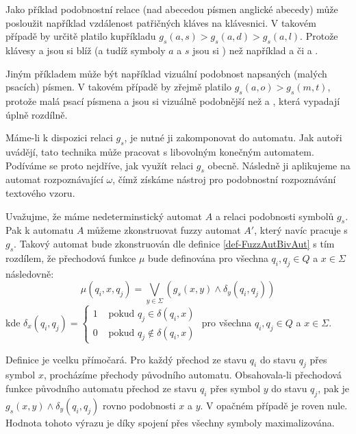 \documentclass[a4paper,10pt]{article}
\begin{document}
\begin{example}
 Jako příklad podobnostní relace (nad abecedou písmen anglické abecedy) může posloužit například vzdálenost patřičných kláves na klávesnici. V takovém případě by určitě platilo kupříkladu $g_s(a,s) > g_s(a, d) > g_s(a, l)$. Protože klávesy  a  jsou si blíž (a tudíž symboly $a$ a $s$ jsou si ) než například  a  či  a .
 
 Jiným příkladem může být například vizuální podobnost napsaných (malých psacích) písmen. V takovém případě by zřejmě platilo $g_s(a, o) > g_s(m, t)$, protože malá psací písmena  a  jsou si vizuálně podobnější než  a , která vypadají úplně rozdílně.
\end{example}

Máme-li k dispozici relaci $g_s$, je nutné ji zakomponovat do automatu. Jak autoři uvádějí, tato technika může pracovat s libovolným konečným automatem. Podíváme se proto nejdříve, jak využít relaci $g_s$ obecně. Následně ji aplikujeme na automat rozpoznávající $\omega$, čímž získáme nástroj pro podobnostní rozpoznávání textového vzoru.

\begin{definition} \label{def-AutPracGS}
Uvažujme, že máme nedeterminstický automat $A$ a relaci podobnosti symbolů $g_s$. Pak k automatu $A$ můžeme zkonstruovat fuzzy automat $A'$, který navíc pracuje s $g_s$. Takový automat bude zkonstruován dle definice \ref{def-FuzzAutBivAut} s tím rozdílem, že přechodová funkce $\mu$ bude definována pro všechna $q_i, q_j \in Q$ a $x \in \Sigma$ následovně:
$$
 \mu(q_i, x, q_j) = \bigvee_{y \in \Sigma} (g_s (x, y) \wedge \delta_y (q_i, q_j))
$$
 kde $\delta_x(q_i, q_j) = 
  \begin{cases}
   1 & \text{ pokud } q_j \in \delta(q_i, x)		\\
   0 & \text{ pokud } q_j \notin \delta(q_i, x)
  \end{cases}
 $ pro všechna $q_i, q_j \in Q$ a $x \in \Sigma$.
\end{definition}

Definice je vcelku přímočará. Pro každý přechod ze stavu $q_i$ do stavu $q_j$ přes symbol $x$, procházíme přechody původního automatu. Obsahovala-li přechodová funkce původního automatu přechod ze stavu $q_i$ přes symbol $y$ do stavu $q_j$, pak je $g_s (x, y) \wedge \delta_y (q_i, q_j)$ rovno podobnosti $x$ a $y$. V opačném případě je roven nule. Hodnota tohoto výrazu je díky spojení přes všechny symboly maximalizována.
\end{document}
